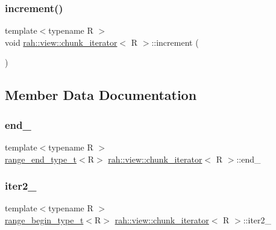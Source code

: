 \subsubsection{\texorpdfstring{increment()}{increment()}}
{\footnotesize\ttfamily template$<$typename R $>$ \\
void \mbox{\hyperlink{structrah_1_1view_1_1chunk__iterator}{rah\+::view\+::chunk\+\_\+iterator}}$<$ R $>$\+::increment (\begin{DoxyParamCaption}{ }\end{DoxyParamCaption})\hspace{0.3cm}{\ttfamily [inline]}}



\subsection{Member Data Documentation}
\mbox{\label{structrah_1_1view_1_1chunk__iterator_a37b0e8a9c07d2061a63ea52c8166f1e2}} 
\subsubsection{\texorpdfstring{end\_}{end\_}}
{\footnotesize\ttfamily template$<$typename R $>$ \\
\mbox{\hyperlink{namespacerah_a9657e24ae477f4482225b133fe286b65}{range\+\_\+end\+\_\+type\+\_\+t}}$<$R$>$ \mbox{\hyperlink{structrah_1_1view_1_1chunk__iterator}{rah\+::view\+::chunk\+\_\+iterator}}$<$ R $>$\+::end\+\_\+}

\mbox{\label{structrah_1_1view_1_1chunk__iterator_a99000f50d2444885032d0346fc0edd52}} 
\subsubsection{\texorpdfstring{iter2\_}{iter2\_}}
{\footnotesize\ttfamily template$<$typename R $>$ \\
\mbox{\hyperlink{namespacerah_a28aff4eeddcece6be65ff0b956d32d4a}{range\+\_\+begin\+\_\+type\+\_\+t}}$<$R$>$ \mbox{\hyperlink{structrah_1_1view_1_1chunk__iterator}{rah\+::view\+::chunk\+\_\+iterator}}$<$ R $>$\+::iter2\+\_\+}

